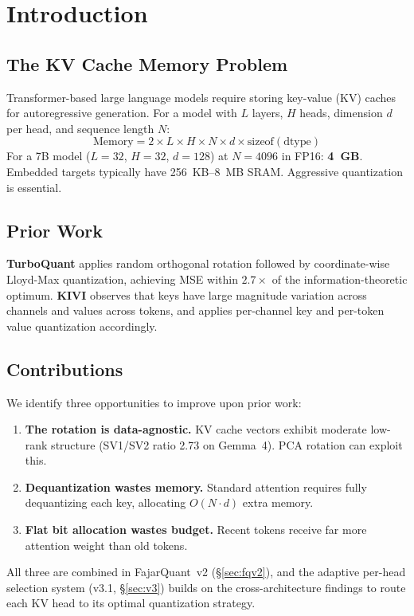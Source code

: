 \documentclass{article}
\begin{document}
\section{Introduction}

\subsection{The KV Cache Memory Problem}

Transformer-based large language models require storing key-value (KV) caches for autoregressive generation. For a model with $L$ layers, $H$ heads, dimension $d$ per head, and sequence length $N$:
\begin{equation}
\text{Memory} = 2 \times L \times H \times N \times d \times \text{sizeof}(\text{dtype})
\end{equation}
For a 7B model ($L{=}32$, $H{=}32$, $d{=}128$) at $N{=}4096$ in FP16: \textbf{4~GB}. Embedded targets typically have 256~KB--8~MB SRAM. Aggressive quantization is essential.

\subsection{Prior Work}

\textbf{TurboQuant} \citep{zandieh2025turboquant} applies random orthogonal rotation followed by coordinate-wise Lloyd-Max quantization, achieving MSE within $2.7\times$ of the information-theoretic optimum. \textbf{KIVI} \citep{liu2024kivi} observes that keys have large magnitude variation across channels and values across tokens, and applies per-channel key and per-token value quantization accordingly.

\subsection{Contributions}

We identify three opportunities to improve upon prior work:
\begin{enumerate}[nosep]
\item \textbf{The rotation is data-agnostic.} KV cache vectors exhibit moderate low-rank structure (SV1/SV2 ratio 2.73 on Gemma~4). PCA rotation can exploit this.
\item \textbf{Dequantization wastes memory.} Standard attention requires fully dequantizing each key, allocating $O(N \cdot d)$ extra memory.
\item \textbf{Flat bit allocation wastes budget.} Recent tokens receive far more attention weight than old tokens.
\end{enumerate}
All three are combined in FajarQuant~v2 (\S\ref{sec:fqv2}), and the
adaptive per-head selection system (v3.1, \S\ref{sec:v3}) builds on
the cross-architecture findings to route each KV head to its optimal
quantization strategy.
\end{document}
